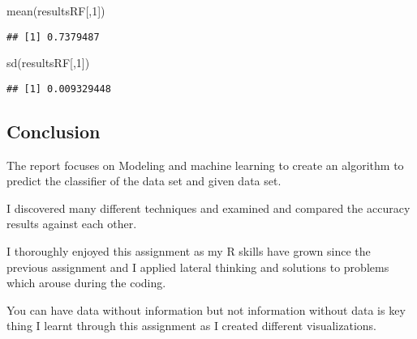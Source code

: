 \documentclass[
]{article}
\newenvironment{Shaded}{\begin{snugshade}}{\end{snugshade}}
\newcommand{\DecValTok}[1]{\textcolor[rgb]{0.00,0.00,0.81}{#1}}
\newcommand{\FunctionTok}[1]{\textcolor[rgb]{0.00,0.00,0.00}{#1}}
\newcommand{\NormalTok}[1]{#1}
\begin{document}
\begin{Shaded}
\begin{Highlighting}[]
\FunctionTok{mean}\NormalTok{(resultsRF[,}\DecValTok{1}\NormalTok{])}
\end{Highlighting}
\end{Shaded}

\begin{verbatim}
## [1] 0.7379487
\end{verbatim}

\begin{Shaded}
\begin{Highlighting}[]
\FunctionTok{sd}\NormalTok{(resultsRF[,}\DecValTok{1}\NormalTok{])}
\end{Highlighting}
\end{Shaded}

\begin{verbatim}
## [1] 0.009329448
\end{verbatim}

\hypertarget{conclusion}{%
\subsection{Conclusion}\label{conclusion}}

The report focuses on Modeling and machine learning to create an
algorithm to predict the classifier of the data set and given data set.

I discovered many different techniques and examined and compared the
accuracy results against each other.

I thoroughly enjoyed this assignment as my R skills have grown since the
previous assignment and I applied lateral thinking and solutions to
problems which arouse during the coding.

You can have data without information but not information without data
is key thing I learnt through this assignment as I created different
visualizations.
\end{document}
